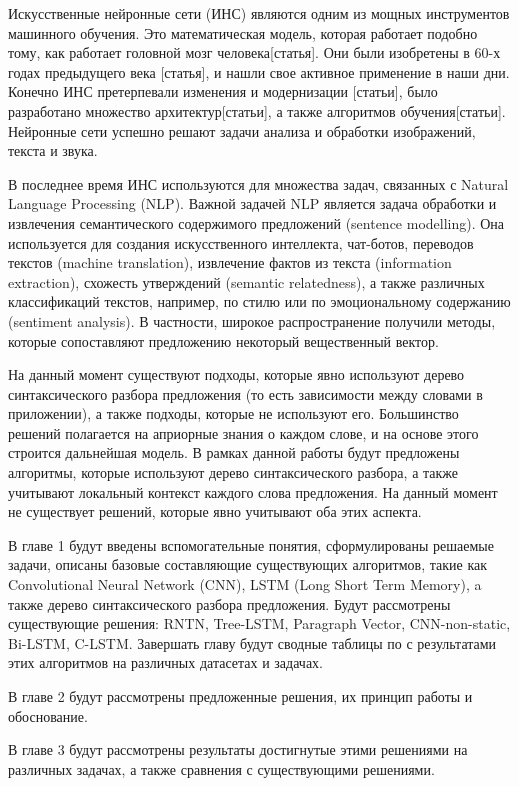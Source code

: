 \startprefacepage

Искусственные нейронные сети (ИНС) являются одним из мощных инструментов машинного
обучения.
Это математическая модель, которая работает подобно тому, как работает головной
мозг человека[статья].
Они были изобретены в 60-х годах предыдущего века [статья], и нашли свое активное
применение в наши дни. Конечно ИНС претерпевали изменения и модернизации
[статьи], было разработано множество архитектур[статьи], а также алгоритмов обучения[статьи].
Нейронные сети успешно решают задачи анализа и обработки изображений, текста и
звука.

В последнее время ИНС используются для множества задач, связанных с Natural
Language Processing (NLP). Важной задачей NLP является задача 
обработки и извлечения семантического содержимого предложений (sentence modelling).
Она используется для создания искусственного интеллекта, чат-ботов,
переводов текстов (machine translation), извлечение фактов из текста (information
extraction), схожесть утверждений (semantic relatedness), 
а также различных классификаций текстов, например,
по стилю или по эмоциональному содержанию (sentiment analysis).
В частности, широкое распространение получили методы, которые сопоставляют предложению некоторый вещественный вектор.

На данный момент существуют подходы, которые явно используют дерево синтаксического разбора предложения (то есть зависимости между словами в приложении), а также подходы, которые не используют его. Большинство решений полагается на априорные знания о каждом слове, и на основе этого строится дальнейшая модель.
В рамках данной работы будут предложены алгоритмы, которые используют дерево синтаксического разбора, а также учитывают локальный контекст каждого слова предложения. На данный момент не существует решений, которые явно учитывают оба этих аспекта.

В главе 1 будут введены вспомогательные понятия, сформулированы решаемые задачи, описаны базовые составляющие существующих алгоритмов, такие как Convolutional Neural Network (CNN), LSTM (Long Short Term Memory), a также дерево синтаксического разбора предложения. Будут рассмотрены существующие решения: RNTN, Tree-LSTM, Paragraph Vector, CNN-non-static, Bi-LSTM, C-LSTM. Завершать главу будут сводные таблицы по с результатами этих алгоритмов на различных датасетах и задачах.

В главе 2 будут рассмотрены предложенные решения, их принцип работы и обоснование.

В главе 3 будут рассмотрены результаты достигнутые этими решениями на различных задачах, а также сравнения с существующими решениями.